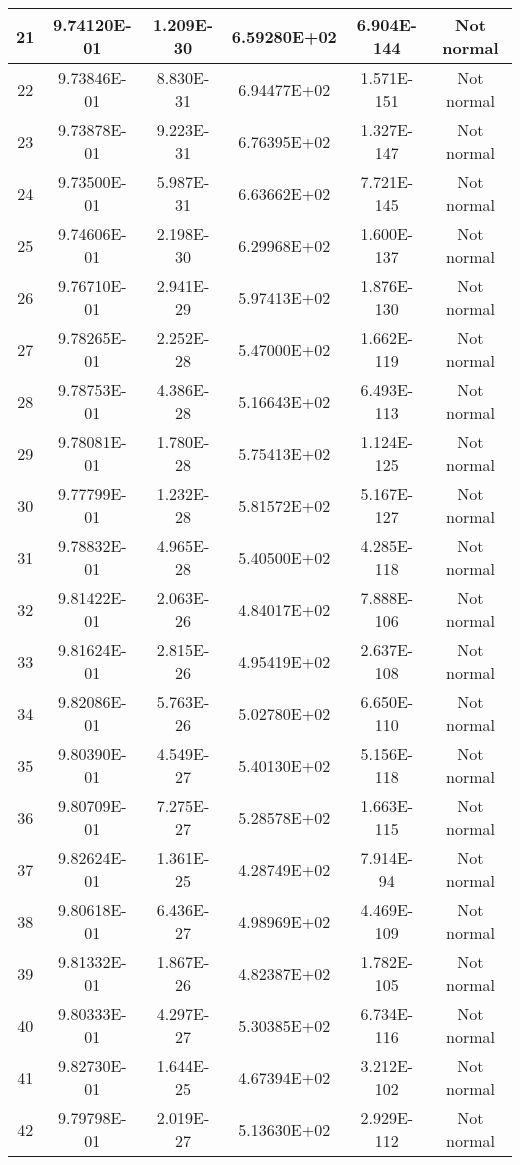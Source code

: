 \begin{table}[h]
\begin{tabular}{|c|c|c|c|c|c|}
		21 & 9.74120E-01 & 1.209E-30 & 6.59280E+02 & 6.904E-144 & Not normal\\\hline
		22 & 9.73846E-01 & 8.830E-31 & 6.94477E+02 & 1.571E-151 & Not normal\\\hline
		23 & 9.73878E-01 & 9.223E-31 & 6.76395E+02 & 1.327E-147 & Not normal\\\hline
		24 & 9.73500E-01 & 5.987E-31 & 6.63662E+02 & 7.721E-145 & Not normal\\\hline
		25 & 9.74606E-01 & 2.198E-30 & 6.29968E+02 & 1.600E-137 & Not normal\\\hline
		26 & 9.76710E-01 & 2.941E-29 & 5.97413E+02 & 1.876E-130 & Not normal\\\hline
		27 & 9.78265E-01 & 2.252E-28 & 5.47000E+02 & 1.662E-119 & Not normal\\\hline
		28 & 9.78753E-01 & 4.386E-28 & 5.16643E+02 & 6.493E-113 & Not normal\\\hline
		29 & 9.78081E-01 & 1.780E-28 & 5.75413E+02 & 1.124E-125 & Not normal\\\hline
		30 & 9.77799E-01 & 1.232E-28 & 5.81572E+02 & 5.167E-127 & Not normal\\\hline
		31 & 9.78832E-01 & 4.965E-28 & 5.40500E+02 & 4.285E-118 & Not normal\\\hline
		32 & 9.81422E-01 & 2.063E-26 & 4.84017E+02 & 7.888E-106 & Not normal\\\hline
		33 & 9.81624E-01 & 2.815E-26 & 4.95419E+02 & 2.637E-108 & Not normal\\\hline
		34 & 9.82086E-01 & 5.763E-26 & 5.02780E+02 & 6.650E-110 & Not normal\\\hline
		35 & 9.80390E-01 & 4.549E-27 & 5.40130E+02 & 5.156E-118 & Not normal\\\hline
		36 & 9.80709E-01 & 7.275E-27 & 5.28578E+02 & 1.663E-115 & Not normal\\\hline
		37 & 9.82624E-01 & 1.361E-25 & 4.28749E+02 & 7.914E-94 & Not normal\\\hline
		38 & 9.80618E-01 & 6.436E-27 & 4.98969E+02 & 4.469E-109 & Not normal\\\hline
		39 & 9.81332E-01 & 1.867E-26 & 4.82387E+02 & 1.782E-105 & Not normal\\\hline
		40 & 9.80333E-01 & 4.297E-27 & 5.30385E+02 & 6.734E-116 & Not normal\\\hline
		41 & 9.82730E-01 & 1.644E-25 & 4.67394E+02 & 3.212E-102 & Not normal\\\hline
		42 & 9.79798E-01 & 2.019E-27 & 5.13630E+02 & 2.929E-112 & Not normal\\\hline

\end{tabular}
\end{table}
